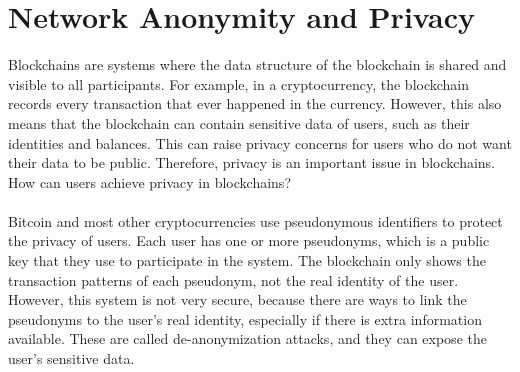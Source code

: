 \section{Network Anonymity and Privacy}
Blockchains are systems where the data structure of the blockchain is shared and visible to all participants. For example, in a cryptocurrency, the blockchain records every transaction that ever happened in the currency. However, this also means that the blockchain can contain sensitive data of users, such as their identities and balances. This can raise privacy concerns for users who do not want their data to be public. Therefore, privacy is an important issue in blockchains. How can users achieve privacy in blockchains?\\\\
Bitcoin and most other cryptocurrencies use pseudonymous identifiers to protect the privacy of users. Each user has one or more pseudonyms, which is a public key that they use to participate in the system. The blockchain only shows the transaction patterns of each pseudonym, not the real identity of the user. However, this system is not very secure, because there are ways to link the pseudonyms to the user’s real identity, especially if there is extra information available. These are called de-anonymization attacks, and they can expose the user’s sensitive data.

